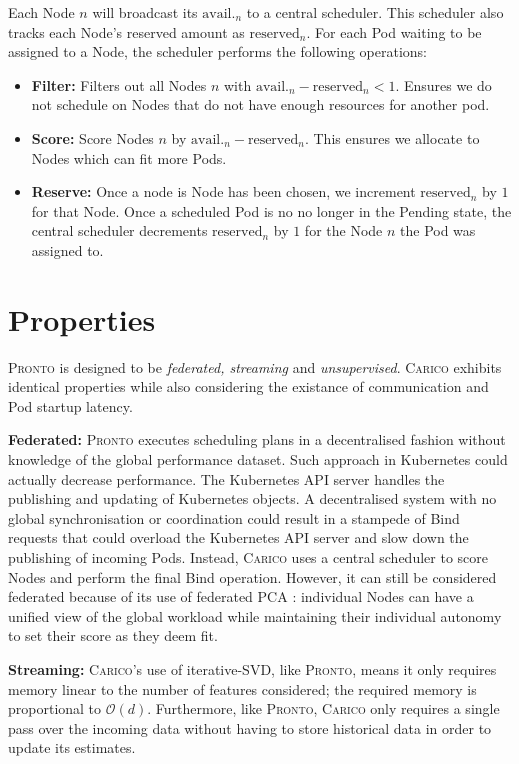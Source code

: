 Each Node $n$ will broadcast its $\text{avail.}_n$ to a central scheduler. This
scheduler also tracks each Node's reserved amount as $\text{reserved}_n$. For
each Pod waiting to be assigned to a Node, the scheduler performs the following
operations:
\begin{itemize}
    \item \textbf{Filter:} Filters out all Nodes $n$ with $\text{avail.}_n -
        \text{reserved}_n < 1$. Ensures we do not schedule on Nodes that do not
        have enough resources for another pod.
    \item \textbf{Score:} Score Nodes $n$ by $\text{avail.}_n -
        \text{reserved}_n$. This ensures we allocate to Nodes which can fit more
        Pods.
    \item \textbf{Reserve:} Once a node is Node has been chosen, we increment
        $\text{reserved}_n$ by $1$ for that Node. Once a scheduled Pod is no
        no longer in the Pending state, the central scheduler decrements
        $\text{reserved}_n$ by $1$ for the Node $n$ the Pod was assigned to.
\end{itemize}

\section{Properties}
\textsc{Pronto} is designed to be \textit{federated, streaming} and
\textit{unsupervised}. \textsc{Carico} exhibits identical properties while also
considering the existance of communication and Pod startup latency.

\textbf{Federated:} \textsc{Pronto} executes scheduling plans in a decentralised fashion
without knowledge of the global performance dataset. Such approach in
Kubernetes could actually decrease performance. The Kubernetes API server
handles the publishing and updating of Kubernetes objects. A decentralised
system with no global synchronisation or coordination could result in a
stampede of Bind requests that could overload the Kubernetes API server and slow
down the publishing of incoming Pods. Instead, \textsc{Carico} uses a central scheduler
to score Nodes and perform the final Bind operation. However, it can still be
considered federated because of its use of federated PCA \cite{}: individual
Nodes can have a unified view of the global workload while maintaining their
individual autonomy to set their score as they deem fit.

\textbf{Streaming:} \textsc{Carico}'s use of iterative-SVD, like \textsc{Pronto}, means it only
requires memory linear to the number of features considered; the required memory
is proportional to $\mathcal{O}(d)$. Furthermore, like \textsc{Pronto}, \textsc{Carico} only
requires a single pass over the incoming data without having to store historical
data in order to update its estimates.

